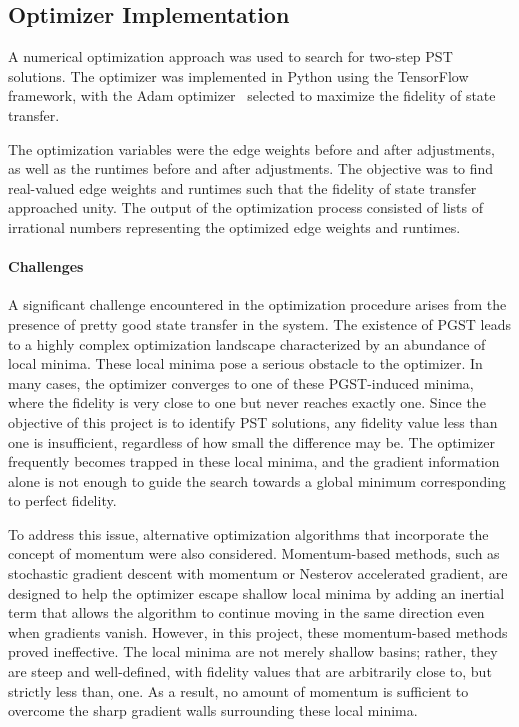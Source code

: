 \documentclass[reprint, aps, 12pt, floatfix]{revtex4-2}
\begin{document}
\subsection{Optimizer Implementation}
A numerical optimization approach was used to search for two-step PST solutions. The optimizer was implemented in Python using the TensorFlow framework, with the Adam optimizer~\cite{kingma2017adammethodstochasticoptimization} selected to maximize the fidelity of state transfer.

The optimization variables were the edge weights before and after adjustments, as well as the runtimes before and after adjustments. The objective was to find real-valued edge weights and runtimes such that the fidelity of state transfer approached unity. The output of the optimization process consisted of lists of irrational numbers representing the optimized edge weights and runtimes.

\paragraph{Challenges}
A significant challenge encountered in the optimization procedure arises from the presence of pretty good state transfer in the system. The existence of PGST leads to a highly complex optimization landscape characterized by an abundance of local minima. These local minima pose a serious obstacle to the optimizer. In many cases, the optimizer converges to one of these PGST-induced minima, where the fidelity is very close to one but never reaches exactly one. Since the objective of this project is to identify PST solutions, any fidelity value less than one is insufficient, regardless of how small the difference may be. The optimizer frequently becomes trapped in these local minima, and the gradient information alone is not enough to guide the search towards a global minimum corresponding to perfect fidelity.

To address this issue, alternative optimization algorithms that incorporate the concept of momentum were also considered. Momentum-based methods, such as stochastic gradient descent with momentum or Nesterov accelerated gradient, are designed to help the optimizer escape shallow local minima by adding an inertial term that allows the algorithm to continue moving in the same direction even when gradients vanish. However, in this project, these momentum-based methods proved ineffective. The local minima are not merely shallow basins; rather, they are steep and well-defined, with fidelity values that are arbitrarily close to, but strictly less than, one. As a result, no amount of momentum is sufficient to overcome the sharp gradient walls surrounding these local minima.
\end{document}
